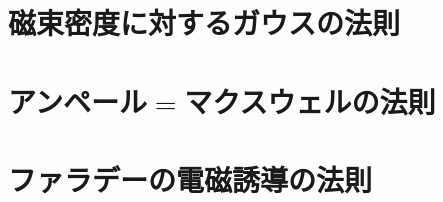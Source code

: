 \chapter{磁束密度に対するガウスの法則}
        

\chapter{アンペール$=$マクスウェルの法則}
        

\chapter{ファラデーの電磁誘導の法則}
        

